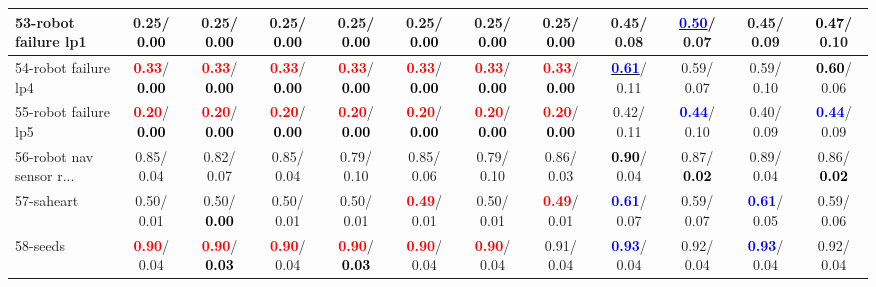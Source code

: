 \begin{table}[h]
\begin{center}
{\begin{tabular}{lc|c|c|c|c|c|c|c|c|c|c}
53-robot failure lp1 &   0.25/\textcolor{black}{\textbf{  0.00}} &   0.25/\textcolor{black}{\textbf{  0.00}} &   0.25/\textcolor{black}{\textbf{  0.00}} &   0.25/\textcolor{black}{\textbf{  0.00}} &   0.25/\textcolor{black}{\textbf{  0.00}} &   0.25/\textcolor{black}{\textbf{  0.00}} &   0.25/\textcolor{black}{\textbf{  0.00}} &   0.45/  0.08 & \underline{\textcolor{blue}{\textbf{  0.50}}}/  0.07 &   0.45/  0.09 & \textcolor{black}{\textbf{  0.47}}/  0.10 \\ \hline
54-robot failure lp4 & \textcolor{red}{\textbf{  0.33}}/\textcolor{black}{\textbf{  0.00}} & \textcolor{red}{\textbf{  0.33}}/\textcolor{black}{\textbf{  0.00}} & \textcolor{red}{\textbf{  0.33}}/\textcolor{black}{\textbf{  0.00}} & \textcolor{red}{\textbf{  0.33}}/\textcolor{black}{\textbf{  0.00}} & \textcolor{red}{\textbf{  0.33}}/\textcolor{black}{\textbf{  0.00}} & \textcolor{red}{\textbf{  0.33}}/\textcolor{black}{\textbf{  0.00}} & \textcolor{red}{\textbf{  0.33}}/\textcolor{black}{\textbf{  0.00}} & \underline{\textcolor{blue}{\textbf{  0.61}}}/  0.11 &   0.59/  0.07 &   0.59/  0.10 & \textcolor{black}{\textbf{  0.60}}/  0.06 \\
55-robot failure lp5 & \textcolor{red}{\textbf{  0.20}}/\textcolor{black}{\textbf{  0.00}} & \textcolor{red}{\textbf{  0.20}}/\textcolor{black}{\textbf{  0.00}} & \textcolor{red}{\textbf{  0.20}}/\textcolor{black}{\textbf{  0.00}} & \textcolor{red}{\textbf{  0.20}}/\textcolor{black}{\textbf{  0.00}} & \textcolor{red}{\textbf{  0.20}}/\textcolor{black}{\textbf{  0.00}} & \textcolor{red}{\textbf{  0.20}}/\textcolor{black}{\textbf{  0.00}} & \textcolor{red}{\textbf{  0.20}}/\textcolor{black}{\textbf{  0.00}} &   0.42/  0.11 & \textcolor{blue}{\textbf{  0.44}}/  0.10 &   0.40/  0.09 & \textcolor{blue}{\textbf{  0.44}}/  0.09 \\
56-robot nav sensor r... &   0.85/  0.04 &   0.82/  0.07 &   0.85/  0.04 &   0.79/  0.10 &   0.85/  0.06 &   0.79/  0.10 &   0.86/  0.03 & \textcolor{black}{\textbf{  0.90}}/  0.04 &   0.87/\textcolor{black}{\textbf{  0.02}} &   0.89/  0.04 &   0.86/\textcolor{black}{\textbf{  0.02}} \\
57-saheart &   0.50/  0.01 &   0.50/\textcolor{black}{\textbf{  0.00}} &   0.50/  0.01 &   0.50/  0.01 & \textcolor{red}{\textbf{  0.49}}/  0.01 &   0.50/  0.01 & \textcolor{red}{\textbf{  0.49}}/  0.01 & \textcolor{blue}{\textbf{  0.61}}/  0.07 &   0.59/  0.07 & \textcolor{blue}{\textbf{  0.61}}/  0.05 &   0.59/  0.06 \\
58-seeds & \textcolor{red}{\textbf{  0.90}}/  0.04 & \textcolor{red}{\textbf{  0.90}}/\textcolor{black}{\textbf{  0.03}} & \textcolor{red}{\textbf{  0.90}}/  0.04 & \textcolor{red}{\textbf{  0.90}}/\textcolor{black}{\textbf{  0.03}} & \textcolor{red}{\textbf{  0.90}}/  0.04 & \textcolor{red}{\textbf{  0.90}}/  0.04 &   0.91/  0.04 & \textcolor{blue}{\textbf{  0.93}}/  0.04 &   0.92/  0.04 & \textcolor{blue}{\textbf{  0.93}}/  0.04 &   0.92/  0.04 \\

\end{tabular}}
\end{center}
\end{table}
